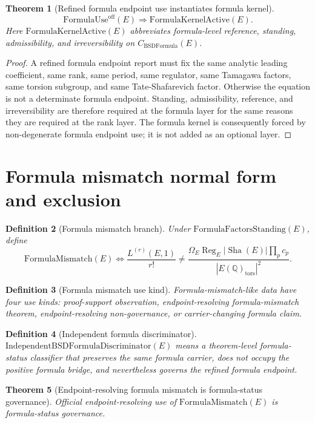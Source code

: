 \documentclass[11pt]{article}
\newtheorem{theorem}{Theorem}[section]
\newtheorem{definition}[theorem]{Definition}
\newcommand{\Q}{\mathbb{Q}}
\newcommand{\Sha}{\operatorname{Sha}}
\newcommand{\Reg}{\operatorname{Reg}}
\newcommand{\tors}{\operatorname{tors}}
\newcommand{\BSDFormula}{\mathrm{BSDFormula}}
\newcommand{\FormulaMismatch}{\mathrm{FormulaMismatch}}
\newcommand{\FormulaUse}{\mathrm{FormulaUse}^{\mathrm{off}}}
\begin{document}
\begin{theorem}[Refined formula endpoint use instantiates formula kernel]\label{thm:formula-kernel}
\[
\FormulaUse(E)
\Rightarrow
\mathrm{FormulaKernelActive}(E).
\]
Here $\mathrm{FormulaKernelActive}(E)$ abbreviates formula-level reference, standing, admissibility, and irreversibility on $C_{\BSDFormula}(E)$.
\end{theorem}

\begin{proof}
A refined formula endpoint report must fix the same analytic leading coefficient, same rank, same period, same regulator, same Tamagawa factors, same torsion subgroup, and same Tate-Shafarevich factor. Otherwise the equation is not a determinate formula endpoint. Standing, admissibility, reference, and irreversibility are therefore required at the formula layer for the same reasons they are required at the rank layer. The formula kernel is consequently forced by non-degenerate formula endpoint use; it is not added as an optional layer.
\end{proof}

\section{Formula mismatch normal form and exclusion}

\begin{definition}[Formula mismatch branch]
Under $\mathrm{FormulaFactorsStanding}(E)$, define
\[
\FormulaMismatch(E)
\Longleftrightarrow
\frac{L^{(r)}(E,1)}{r!}
\ne
\frac{\Omega_E\Reg_E |\Sha(E)|\prod_p c_p}{|E(\Q)_{\tors}|^2}.
\]
\end{definition}

\begin{definition}[Formula mismatch use kind]
Formula-mismatch-like data have four use kinds: proof-support observation, endpoint-resolving formula-mismatch theorem, endpoint-resolving non-governance, or carrier-changing formula claim.
\end{definition}

\begin{definition}[Independent formula discriminator]
$\mathrm{IndependentBSDFormulaDiscriminator}(E)$ means a theorem-level formula-status classifier that preserves the same formula carrier, does not occupy the positive formula bridge, and nevertheless governs the refined formula endpoint.
\end{definition}

\begin{theorem}[Endpoint-resolving formula mismatch is formula-status governance]\label{thm:formula-governance}
Official endpoint-resolving use of $\FormulaMismatch(E)$ is formula-status governance.
\end{theorem}
\end{document}
